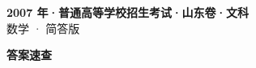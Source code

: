 \documentclass[zihao=-4, a4paper]{ctexart}
\begin{document}
\begin{center}
  {\Large\bfseries 2007 年·普通高等学校招生考试·山东卷·文科}\\[4pt]
  {\large 数学 · 简答版}
\end{center}
\medskip
{}

\clearpage
{}
\begin{center}{\Large\bfseries 答案速查}\end{center}
\medskip

\end{document}
